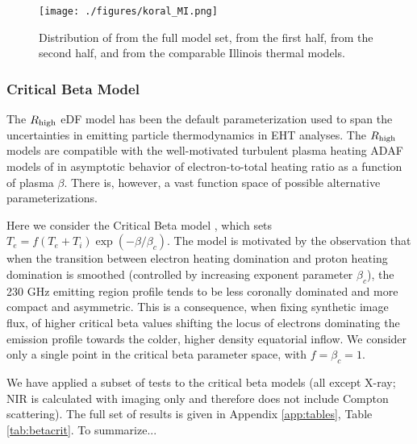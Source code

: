\begin{figure}
  \centering
  \texttt{[image: ./figures/koral\_MI.png]}
  \caption{Distribution of \mi from the full \koral model set, from the first half, from the second half, and from the comparable Illinois thermal models.}
  \label{fig:koral_MI}
\end{figure}  

\subsubsection{Critical Beta Model}

The $R_\mathrm{high}$ eDF model has been the default parameterization used to span the uncertainties in emitting particle thermodynamics in EHT analyses. The $R_\mathrm{high}$ models  are compatible with the well-motivated turbulent plasma heating ADAF models of \cite{1999ApJ...520..248Q} in asymptotic behavior of electron-to-total heating ratio as a function of plasma $\beta$. There is, however, a vast function space of possible alternative parameterizations.

Here we consider the Critical Beta model \cite{2020MNRAS.493.1404A}, which sets $T_e = f (T_e + T_i) \exp(-\beta/\beta_c)$.  The model is motivated by the observation that when the transition between electron heating domination and proton heating domination is smoothed (controlled by increasing exponent parameter $\beta_c$), the 230 GHz emitting region profile tends to be less coronally dominated and more compact and asymmetric. This is a consequence, when fixing synthetic image flux, of higher critical beta values shifting the locus of electrons dominating the emission profile towards the colder, higher density equatorial inflow.  We consider only a single point in the critical beta parameter space, with $f = \beta_c = 1$.  

We have applied a subset of tests to the critical beta models (all except X-ray; NIR is calculated with imaging only and therefore does not include Compton scattering).  The full set of results is given in Appendix \ref{app:tables}, Table \ref{tab:betacrit}.  To summarize...



